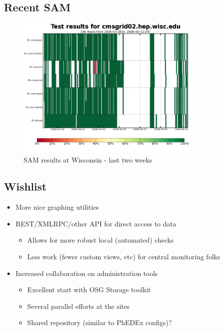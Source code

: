 \documentclass{beamer}
\begin{document}
\subsection{Recent SAM}
\begin{frame}
\begin{figure}
    \includegraphics[height=7cm]{Graphics/sam.png}
    \caption{SAM results at Wisconsin - last two weeks}
\end{figure}
\end{frame}

\subsection{Wishlist}
\begin{frame}
\begin{itemize}
    \item More nice graphing utilities
    \item REST/XMLRPC/other API for direct access to data
    \begin{itemize}
        \item Allows for more robust local (automated) checks
        \item Less work (fewer custom views, etc) for central monitoring folks
    \end{itemize}
    \item Increased collaboration on administration tools
    \begin{itemize}
        \item Excellent start with OSG Storage toolkit
        \item Several parallel efforts at the sites
        \item Shared repository (similar to PhEDEx configs)?
    \end{itemize}
\end{itemize}
\end{frame}
\end{document}
